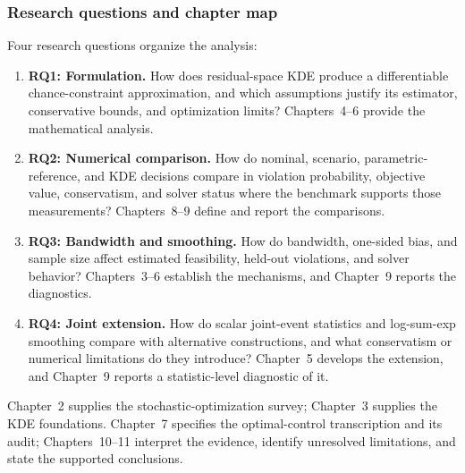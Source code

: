 \subsubsection{Research questions and chapter map}\label{ssec:rqs}
Four research questions organize the analysis:
\begin{enumerate}
  \item \textbf{RQ1: Formulation.} How does residual-space KDE produce a differentiable chance-constraint approximation, and which assumptions justify its estimator, conservative bounds, and optimization limits? Chapters~4--6 provide the mathematical analysis.
  \item \textbf{RQ2: Numerical comparison.} How do nominal, scenario, parametric-reference, and KDE decisions compare in violation probability, objective value, conservatism, and solver status where the benchmark supports those measurements? Chapters~8--9 define and report the comparisons.
  \item \textbf{RQ3: Bandwidth and smoothing.} How do bandwidth, one-sided bias, and sample size affect estimated feasibility, held-out violations, and solver behavior? Chapters~3--6 establish the mechanisms, and Chapter~9 reports the diagnostics.
  \item \textbf{RQ4: Joint extension.} How do scalar joint-event statistics and log-sum-exp smoothing compare with alternative constructions, and what conservatism or numerical limitations do they introduce? Chapter~5 develops the extension, and Chapter~9 reports a statistic-level diagnostic of it.
\end{enumerate}
Chapter~2 supplies the stochastic-optimization survey; Chapter~3 supplies the KDE foundations. Chapter~7 specifies the optimal-control transcription and its audit; Chapters~10--11 interpret the evidence, identify unresolved limitations, and state the supported conclusions.
